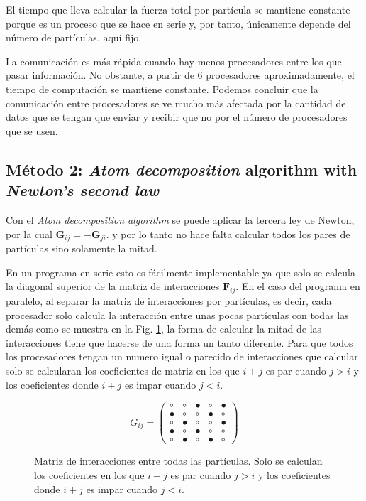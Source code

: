 \documentclass[onecolumn]{article}
\renewcommand{\vec}[1]{\mathbf{#1}}
\begin{document}
El tiempo que lleva calcular la fuerza total por partícula se mantiene constante porque es un proceso que se hace en serie y, por tanto, únicamente depende del número de partículas, aquí fijo.

La comunicación es más rápida cuando hay menos procesadores entre los que pasar información. No obstante, a partir de 6 procesadores aproximadamente, el tiempo de computación se mantiene constante. Podemos concluir que la comunicación entre procesadores se ve mucho más afectada por la cantidad de datos que se tengan que enviar y recibir que no por el número de procesadores que se usen.






\subsection{Método 2: \textit{Atom decomposition} algorithm with \textit{Newton's second law}}



Con el \textit{Atom decomposition algorithm} se puede aplicar la tercera ley de Newton, por la cual $\vec{G}_{ij}=-\vec{G}_{ji}$. y por lo tanto no hace falta calcular todos los pares de partículas sino solamente la mitad. 

En un programa en serie esto es fácilmente implementable ya que solo se calcula la diagonal superior de la matriz de interacciones $\vec{F}_{ij}$. En el caso del programa en paralelo, al separar la matriz de interacciones por partículas, es decir, cada procesador solo calcula la interacción entre unas pocas partículas con todas las demás como se muestra en la Fig. \ref{interaction_mat2}, la forma de calcular la mitad de las interacciones tiene que hacerse de una forma un tanto diferente. Para que todos los procesadores tengan un numero igual o parecido de interacciones que calcular solo se calcularan los coeficientes de matriz en los que $i+j$ es par cuando $j>i$ y los coeficientes donde $i+j$ es impar cuando $j<i$.

\begin{figure}[ht]
\begin{equation*}
  G_{ij} = \begin{pmatrix}
\circ  & \circ & \bullet & \circ & \bullet\\ 
\bullet & \circ & \circ &\bullet  & \circ\\ 
\circ & \bullet & \circ & \circ &\bullet \\ 
\bullet & \circ & \bullet &\circ  &\circ \\ 
\circ &\bullet  & \circ &\bullet  & \circ
\end{pmatrix}
\end{equation*}
\caption{Matriz de interacciones entre todas las partículas. Solo se calculan los coeficientes en los que $i+j$ es par cuando $j>i$ y los coeficientes donde $i+j$ es impar cuando $j<i$.}
\label{interaction_mat2}
\end{figure}
\end{document}
